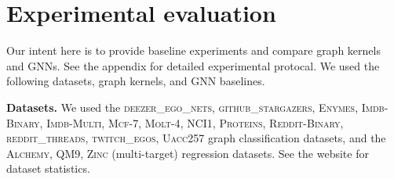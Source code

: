 \documentclass{article}
\newcommand{\xhdr}[1]{{\noindent\bfseries #1}}
\theoremstyle{definition}
\begin{document}
\begin{table}[]\centering	
	\caption{Mean MAE (mean std. MAE, logMAE) on large-scale (multi-target) molecular regression tasks.\label{neural_short_tt}}
\end{table}		

\section{Experimental evaluation}

Our intent here is to provide baseline experiments and compare graph kernels and GNNs. See the appendix for detailed experimental protocal. We used the following datasets, graph kernels, and GNN baselines.

\xhdr{Datasets.} We used the \textsc{deezer\_ego\_nets}, \textsc{github\_stargazers}, \textsc{Enymes}, \textsc{Imdb-Binary}, \textsc{Imdb-Multi}, \textsc{Mcf-7}, \textsc{Molt-4},	\textsc{NCI1}, \textsc{Proteins},
\textsc{Reddit-Binary},	\textsc{reddit\_threads}, \textsc{twitch\_egos}, \textsc{Uacc257} graph classification datasets, and the \textsc{Alchemy}, \textsc{QM9}, \textsc{Zinc} (multi-target) regression datasets. See the website for dataset statistics.
\end{document}
